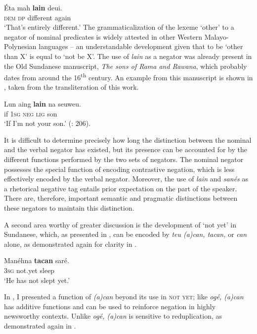 \documentclass[output=paper]{langscibook}
\begin{document}
\ea\label{ex:sun:66} 
    \gll  Éta mah \textbf{lain} deui.\\ 
           \textsc{dem} \textsc{dp} different again\\
    \glt ‘That’s entirely different.’ \citep[61]{Butters2021}
\z 
The grammaticalization of the lexeme ‘other’ to a negator of nominal predicates is widely attested in other Western Malayo-Polynesian languages – an understandable development given that to be ‘other than X’ is equal to ‘not be X’. The use of \textit{lain} as a negator was already present in the Old Sundanese manuscript, \textit{The sons of Rama and Rawana}, which probably dates from around the 16\textsuperscript{th} century. An example from this manuscript is shown in , taken from the transliteration of this work. 

\ea\label{ex:sun:67} 
    \gll  Lun aing \textbf{lain} na seuweu.\\ 
          if 1\textsc{sg} \textsc{neg} \textsc{lig} son\\
    \glt ‘If I’m not your son.’ (\citealt{NoorduynTeeuw2006}: 206).
\z 

It is difficult to determine precisely how long the distinction between the nominal and the verbal negator has existed, but its presence can be accounted for by the different functions performed by the two sets of negators. The nominal negator possesses the special function of encoding contrastive negation, which is less effectively encoded by the verbal negator. Moreover, the use of \textit{lain} and \textit{sanés} as a rhetorical negative tag entails prior expectation on the part of the speaker. There are, therefore, important semantic and pragmatic distinctions between these negators to maintain this distinction. 

 A second area worthy of greater discussion is the development of ‘{not yet}’ in Sundanese, which, as presented in , can be encoded by \textit{teu (a)can, tacan,} or \textit{can} alone, as demonstrated again for clarity in . 

\ea\label{ex:sun:68} 
    \gll  Manéhna \textbf{tacan} saré.\\ 
          3\textsc{sg} not.yet sleep\\
    \glt ‘He has not slept yet.’
\z

In , I presented a function of \textit{(a)can} beyond its use in \textsc{not} \textsc{yet}; like \textit{ogé, (a)can} has additive functions and can be used to reinforce negation in highly newsworthy contexts. Unlike \textit{ogé, (a)can} is sensitive to reduplication, as demonstrated again in . 
\end{document}
